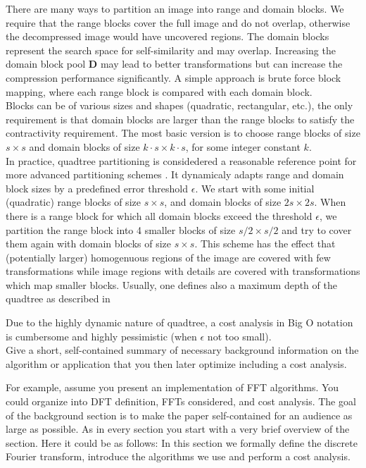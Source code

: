 There are many ways to partition an image into range and domain blocks. We require that the range blocks cover the full image and do not overlap, otherwise the
decompressed image would have uncovered regions. The domain blocks represent the search space for self-similarity and may overlap. 
Increasing the domain block pool $\boldsymbol{D}$ may lead to better transformations but can increase the compression performance significantly.
A simple approach is brute force block mapping, where each range block is compared with each domain block.\\
Blocks can be of various sizes and shapes (quadratic, rectangular, etc.), the only requirement is that domain blocks are larger than the range blocks to satisfy the
contractivity requirement. The most basic version is to choose range blocks of size $s \times s$ and domain blocks of size $k\cdot s \times k \cdot s$, for some
integer constant $k$.\\
In practice, quadtree partitioning is considedered a reasonable reference point for more advanced partitioning schemes \cite{fisher2012}. 
It dynamicaly adapts range and domain block sizes by a predefined error threshold $\epsilon$. 
We start with some initial (quadratic) range blocks of size $s \times s$, and domain blocks of size $2s \times 2s$. 
When there is a range block for which all domain blocks exceed the threshold $\epsilon$, we partition
the range block into 4 smaller blocks of size $s/2 \times s/2$ and try to cover them again with domain blocks of size $s \times s$.
This scheme has the effect that (potentially larger) homogenuous regions of the image are covered with few transformations while image
regions with details are covered with transformations which map smaller blocks. 
Usually, one defines also a maximum depth of the quadtree as described in \cite{fisher2012}


Due to the highly dynamic nature of quadtree, a cost analysis in Big O notation is cumbersome and highly pessimistic (when $\epsilon$ not too small).\\


Give a short, self-contained summary of necessary
background information on the algorithm or application that you then later optimize including a cost analysis.

For example, assume you present an
implementation of FFT algorithms. You could organize into DFT
definition, FFTs considered, and cost analysis. The goal of the
background section is to make the paper self-contained for an audience
as large as possible. As in every section
you start with a very brief overview of the section. Here it could be as follows: In this section
we formally define the discrete Fourier transform, introduce the algorithms we use
and perform a cost analysis.

